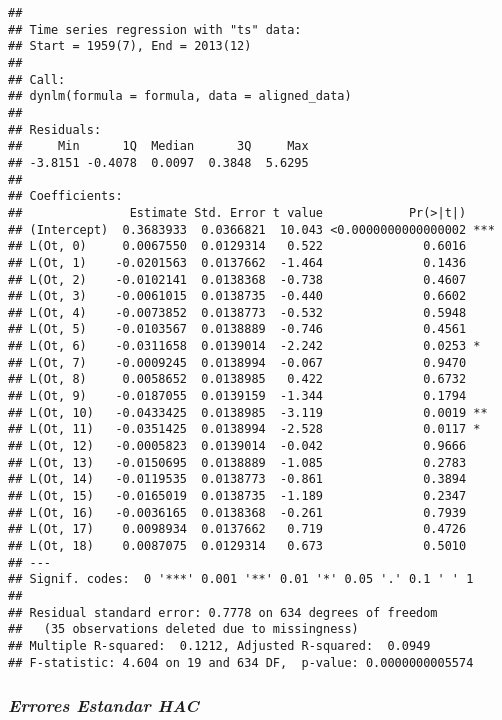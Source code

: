\documentclass[
  12pt,
]{article}
\begin{document}
\begin{verbatim}
## 
## Time series regression with "ts" data:
## Start = 1959(7), End = 2013(12)
## 
## Call:
## dynlm(formula = formula, data = aligned_data)
## 
## Residuals:
##     Min      1Q  Median      3Q     Max 
## -3.8151 -0.4078  0.0097  0.3848  5.6295 
## 
## Coefficients:
##               Estimate Std. Error t value            Pr(>|t|)    
## (Intercept)  0.3683933  0.0366821  10.043 <0.0000000000000002 ***
## L(Ot, 0)     0.0067550  0.0129314   0.522              0.6016    
## L(Ot, 1)    -0.0201563  0.0137662  -1.464              0.1436    
## L(Ot, 2)    -0.0102141  0.0138368  -0.738              0.4607    
## L(Ot, 3)    -0.0061015  0.0138735  -0.440              0.6602    
## L(Ot, 4)    -0.0073852  0.0138773  -0.532              0.5948    
## L(Ot, 5)    -0.0103567  0.0138889  -0.746              0.4561    
## L(Ot, 6)    -0.0311658  0.0139014  -2.242              0.0253 *  
## L(Ot, 7)    -0.0009245  0.0138994  -0.067              0.9470    
## L(Ot, 8)     0.0058652  0.0138985   0.422              0.6732    
## L(Ot, 9)    -0.0187055  0.0139159  -1.344              0.1794    
## L(Ot, 10)   -0.0433425  0.0138985  -3.119              0.0019 ** 
## L(Ot, 11)   -0.0351425  0.0138994  -2.528              0.0117 *  
## L(Ot, 12)   -0.0005823  0.0139014  -0.042              0.9666    
## L(Ot, 13)   -0.0150695  0.0138889  -1.085              0.2783    
## L(Ot, 14)   -0.0119535  0.0138773  -0.861              0.3894    
## L(Ot, 15)   -0.0165019  0.0138735  -1.189              0.2347    
## L(Ot, 16)   -0.0036165  0.0138368  -0.261              0.7939    
## L(Ot, 17)    0.0098934  0.0137662   0.719              0.4726    
## L(Ot, 18)    0.0087075  0.0129314   0.673              0.5010    
## ---
## Signif. codes:  0 '***' 0.001 '**' 0.01 '*' 0.05 '.' 0.1 ' ' 1
## 
## Residual standard error: 0.7778 on 634 degrees of freedom
##   (35 observations deleted due to missingness)
## Multiple R-squared:  0.1212, Adjusted R-squared:  0.0949 
## F-statistic: 4.604 on 19 and 634 DF,  p-value: 0.0000000005574
\end{verbatim}

\subsubsection{\texorpdfstring{\textbf{\emph{Errores Estandar
HAC}}}{Errores Estandar HAC}}\label{errores-estandar-hac}
\end{document}
